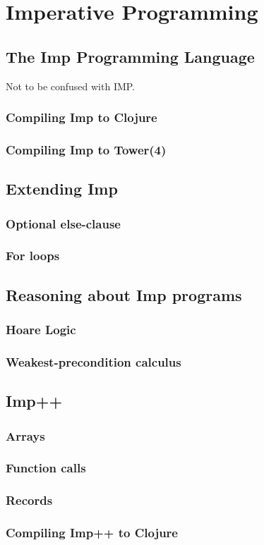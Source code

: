 \chapter{Imperative Programming}

\section{The Imp Programming Language}

Not to be confused with IMP.

\subsection{Compiling Imp to Clojure}

\subsection{Compiling Imp to Tower(4)}

\section{Extending Imp}

\subsection{Optional else-clause}

\subsection{For loops}

\section{Reasoning about Imp programs}

\subsection{Hoare Logic}

\subsection{Weakest-precondition calculus}

\section{Imp++}

\subsection{Arrays}

\subsection{Function calls}

\subsection{Records}

\subsection{Compiling Imp++ to Clojure}

